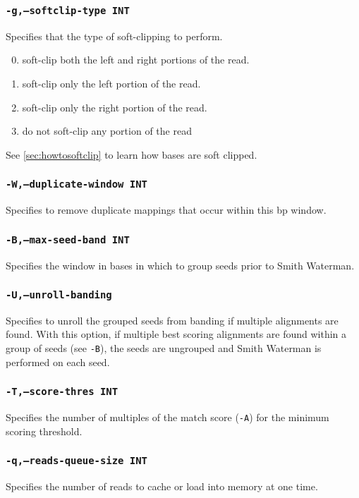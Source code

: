 \documentclass[a4paper,12pt]{book}
\newcommand{\TT}[1]{{\tt #1}} %
\begin{document}
\subsubsection{\TT{-g,--softclip-type INT}}
Specifies that the type of soft-clipping to perform.
\begin{enumerate}
	\setcounter{enumi}{-1} %
	\item soft-clip both the left and right portions of the read.
	\item soft-clip only the left portion of the read.
	\item soft-clip only the right portion of the read.
	\item do not soft-clip any portion of the read
\end{enumerate}
See \autoref{sec:howtosoftclip} to learn how bases are soft clipped.

\subsubsection{\TT{-W,--duplicate-window INT}}
Specifies to remove duplicate mappings that occur within this bp window.

\subsubsection{\TT{-B,--max-seed-band INT}}
Specifies the window in bases in which to group seeds prior to Smith Waterman.

\subsubsection{\TT{-U,--unroll-banding}}
Specifies to unroll the grouped seeds from banding if multiple alignments are found.
With this option, if multiple best scoring alignments are found within a group of seeds (see \TT{-B}), the seeds are ungrouped and Smith Waterman is performed on each seed.

\subsubsection{\TT{-T,--score-thres INT}}
Specifies the number of multiples of the match score (\TT{-A}) for the minimum scoring threshold.

\subsubsection{\TT{-q,--reads-queue-size INT}}
Specifies the number of reads to cache or load into memory at one time.
\end{document}
